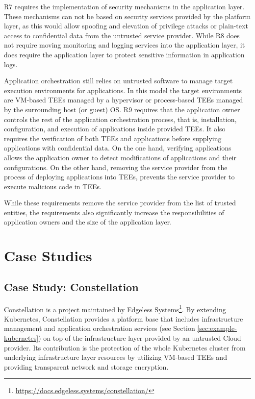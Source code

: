 R7 requires the implementation of security mechanisms in the application layer.
These mechanisms can not be based on security services provided by the platform
layer, as this would allow spoofing and elevation of privilege attacks or
plain-text access to confidential data from the untrusted service provider.
While R8 does not require moving monitoring and logging services into the
application layer, it does require the application layer to protect sensitive
information in application logs.

Application orchestration still relies on untrusted software to manage target
execution environments for applications. In this model the target environments
are VM-based TEEs managed by a hypervisor or process-based TEEs managed by the
surrounding host (or guest) OS. R9 requires that the application owner controls
the rest of the application orchestration process, that is, installation,
configuration, and execution of applications inside provided TEEs. It also
requires the verification of both TEEs and applications before supplying
applications with confidential data. On the one hand, verifying applications
allows the application owner to detect modifications of applications and their
configurations. On the other hand, removing the service provider from the
process of deploying applications into TEEs, prevents the service provider to
execute malicious code in TEEs.

While these requirements remove the service provider from the list of trusted
entities, the requirements also significantly increase the responsibilities of
application owners and the size of the application layer.


\section{Case Studies}
\label{sec:case-studies}

\subsection{Case Study: Constellation}

Constellation is a project maintained by Edgeless
Systems\footnote{\url{https://docs.edgeless.systems/constellation/}}. By
extending Kubernetes, Constellation provides a platform base that includes
infrastructure management and application orchestration services (see Section
\ref{sec:example-kubernetes}) on top of the infrastructure layer provided by an
untrusted Cloud provider. Its contribution is the protection of the whole
Kubernetes cluster from underlying infrastructure layer resources by utilizing
VM-based TEEs and providing transparent network and storage encryption.

